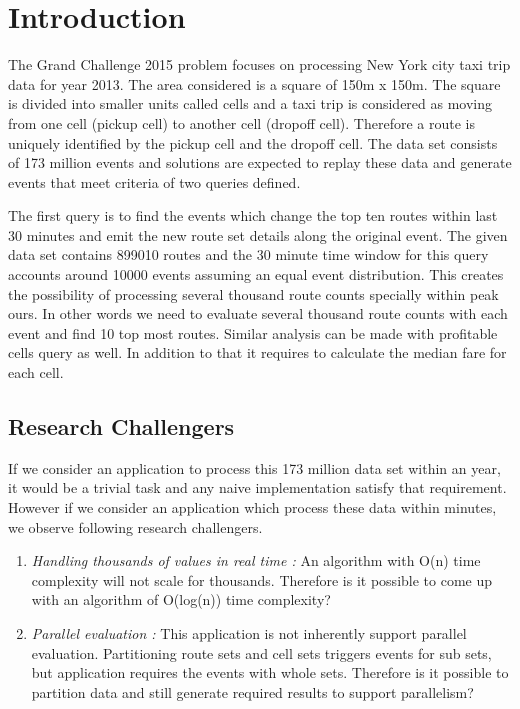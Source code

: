 \section{Introduction}

The Grand Challenge 2015 problem focuses on processing New York city taxi trip data for year 2013. The area considered is a square of 150m x  150m. The  square is divided into smaller units called cells and a taxi trip is considered as moving from one cell (pickup cell) to another cell (dropoff cell). Therefore a route is uniquely identified by the pickup cell and the dropoff cell. The data set consists of 173 million events and solutions are expected to replay these data and generate events that meet criteria of two queries defined. 

The first query is to find the events which change the top ten routes within last 30 minutes and emit the new route set details along the original event. The given data set contains 899010  routes and the 30 minute time window for this query accounts around 10000 events assuming an equal event distribution. This creates the possibility of processing several thousand route counts specially within peak ours. In other words we need to evaluate several thousand route counts with each event and find 10 top most routes. Similar analysis can be made with profitable cells query as well. In addition to that it requires to  calculate the median fare for each cell. 

\subsection{Research Challengers}

If we consider an application to process this 173 million data set within an year, it would be a trivial task and any naive implementation satisfy that requirement. However if we consider an application which process these data within minutes, we observe following research challengers.
\begin{enumerate}
	\item \textit{Handling thousands of values in real time :}  An algorithm with O(n) time complexity will not scale for thousands. Therefore is it possible to come up with an algorithm of O(log(n)) time complexity?
	\item \textit{Parallel evaluation :}  This application is not inherently support parallel evaluation. Partitioning route sets and cell sets triggers events for sub sets, but application requires the events with whole sets. Therefore is it possible to partition data and still generate required results to support parallelism?  
\end{enumerate}

